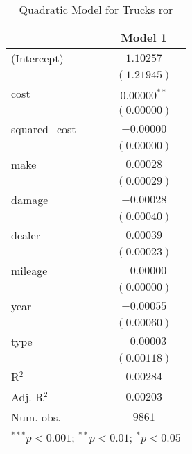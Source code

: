 
\begin{table}
\begin{center}
\begin{tabular}{l c}
\hline
 & Model 1 \\
\hline
(Intercept)   & $1.10257$      \\
              & $(1.21945)$    \\
cost          & $0.00000^{**}$ \\
              & $(0.00000)$    \\
squared\_cost & $-0.00000$     \\
              & $(0.00000)$    \\
make          & $0.00028$      \\
              & $(0.00029)$    \\
damage        & $-0.00028$     \\
              & $(0.00040)$    \\
dealer        & $0.00039$      \\
              & $(0.00023)$    \\
mileage       & $-0.00000$     \\
              & $(0.00000)$    \\
year          & $-0.00055$     \\
              & $(0.00060)$    \\
type          & $-0.00003$     \\
              & $(0.00118)$    \\
\hline
R$^2$         & $0.00284$      \\
Adj. R$^2$    & $0.00203$      \\
Num. obs.     & $9861$         \\
\hline
\multicolumn{2}{l}{\scriptsize{$^{***}p<0.001$; $^{**}p<0.01$; $^{*}p<0.05$}}
\end{tabular}
\caption{Quadratic Model for Trucks ror}
\label{tab:reg_sq_cost}
\end{center}
\end{table}
